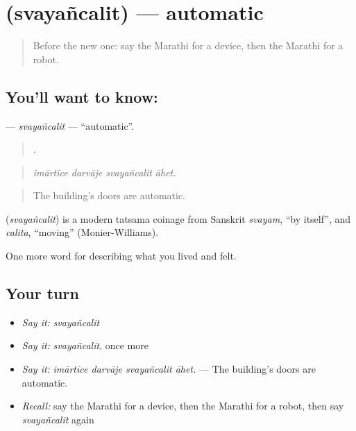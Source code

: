 \section[\texorpdfstring{\mr{स्वयंचलित} (svayañcalit)}{स्वयंचलित (svayañcalit)}]{ (svayañcalit) — automatic}

\label{lesson:MR-C518-svayancalit}



\begin{quote}
Before the new one: say the Marathi for a device, then the Marathi for a robot.
\end{quote}

\subsection*{You'll want to know: }
\textbf{} — \emph{svayañcalit} — \textquotedblleft{}automatic\textquotedblright{}.

\begin{quote}
   .
\end{quote}

\begin{quote}
\emph{imārtīce darvāje svayañcalit āhet.}
\end{quote}

\begin{quote}
The building's doors are automatic.
\end{quote}

\begin{cousinweb}
\textbf{} (\emph{svayañcalit}) is a modern tatsama coinage from Sanskrit \emph{svayam}, \textquotedblleft{}by itself\textquotedblright{}, and \emph{calita}, \textquotedblleft{}moving\textquotedblright{} (Monier-Williams).
\end{cousinweb}

\begin{grammarlens}[title={What you've built}]
One more word for describing what you lived and felt.
\end{grammarlens}

\subsection*{Your turn}
\begin{itemize}
\raggedright
  \item \emph{Say it:} \emph{svayañcalit}
  \item \emph{Say it:} \emph{svayañcalit}, once more
  \item \emph{Say it:} \emph{imārtīce darvāje svayañcalit āhet.} — The building's doors are automatic.
  \item \emph{Recall:} say the Marathi for a device, then the Marathi for a robot, then say \emph{svayañcalit} again
\end{itemize}

